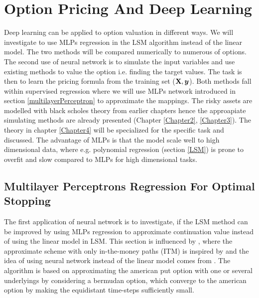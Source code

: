 
\chapter{Option Pricing And Deep Learning} %

\label{Chapter5} %

Deep learning can be applied to option valuation in different ways. We will investigate to use MLPs regression in the LSM algorithm instead of the linear model. The two methods will be compared numerically to numerous of options. The second use of neural network is to simulate the input variables and use existing methods to value the option i.e. finding the target values. The task is then to learn the pricing formula from the training set ($\mathbf{X}, \bm{y}$). Both methods fall within supervised regression where we will use MLPs network introduced in section \ref{multilayerPerceptron} to approximate the mappings. The risky assets are modelled with black scholes theory from earlier chapters hence the approapiate simulating methods are already presented (Chapter \ref{Chapter2}, \ref{Chapter3}). The theory in chapter \ref{Chapter4} will be specialized for the specific task and discussed. The advantage of MLPs is that the model scale well to high dimensional data, where e.g. polynomial regression (section \ref{LSM}) is prone to overfit and slow compared to MLPs for high dimensional tasks. 

\section{Multilayer Perceptrons Regression For Optimal Stopping}
The first application of neural network is to investigate, if the LSM method can be improved by using MLPs regression to approximate continuation value instead of using the linear model in LSM. This section is influenced by \parencite{lsm, Lelong19, KohlerMichael2010}, where the approximate scheme with only in-the-money paths (ITM) is inspired by \parencite{lsm} and the idea of using neural network instead of the linear model comes from \parencite{KohlerMichael2010, Lelong19}. The algorithm is based on approximating the american put option with one or several underlyings by considering a bermudan option, which converge to the american option by making the equidistant time-steps sufficiently small. \\

